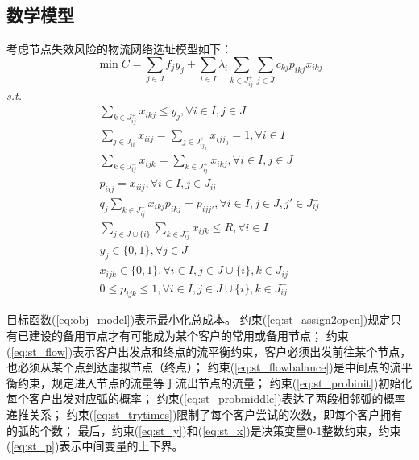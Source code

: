 \subsection{数学模型}
\label{subsec:st}
考虑节点失效风险的物流网络选址模型如下：
\begin{equation}
\label{eq:obj_model}
\min C = \sum_{j\in J}f_jy_j + \sum_{i\in I}\lambda_i \sum_{k\in J_{ij}^+}\sum_{j\in \bar{J}} c_{kj} p_{ikj} x_{ikj}
\end{equation}
\textit{s.t.}
\begin{gather}
\sum_{k\in J_{ij}^+}x_{ikj} \le y_j ,\forall i \in I , j\in J \label{eq:st_assign2open}\\
\sum_{j\in J_{ii}^-}x_{iij} = \sum_{j\in J_{i{j_{0}}}^+} x_{ijj_0} = 1, \forall i \in I  \label{eq:st_flow}\\
\sum_{k\in J_{ij}^-} x_{ijk} = \sum_{k\in J_{ij}^+} x_{ikj}, \forall i \in I, j \in J \label{eq:st_flowbalance}\\
p_{iij} = x_{iij}, \forall i\in I, j\in J_{ii}^- \label{eq:st_probinit}\\
q_j\sum_{k\in J_{ij}^+} x_{ikj} p_{ikj}= p_{ijj'}, \forall i \in I, j \in J, j'\in J_{ij}^- \label{eq:st_probmiddle} \\
\sum_{j\in J\cup\{i\}} \sum_{k\in J_{ij}^-} x_{ijk} \le R, \forall i\in I \label{eq:st_trytimes} \\
y_{j} \in\{0,1\}, \forall j \in {J} \label{eq:st_y}\\
x_{ijk} \in \{0,1\}, \forall i \in I, j \in J\cup \{i\}, k\in J_{ij}^- \label{eq:st_x}\\
0 \le p_{ijk} \le 1, \forall i \in I, j \in J\cup \{i\}, k\in J_{ij}^- \label{eq:st_p}
\end{gather}

目标函数(\ref{eq:obj_model})表示最小化总成本。
约束(\ref{eq:st_assign2open})规定只有已建设的备用节点才有可能成为某个客户的常用或备用节点；
约束(\ref{eq:st_flow})表示客户出发点和终点的流平衡约束，客户必须出发前往某个节点，也必须从某个点到达虚拟节点（终点）；
约束(\ref{eq:st_flowbalance})是中间点的流平衡约束，规定进入节点的流量等于流出节点的流量；
约束(\ref{eq:st_probinit})初始化每个客户出发对应弧的概率；
约束(\ref{eq:st_probmiddle})表达了两段相邻弧的概率递推关系；
约束(\ref{eq:st_trytimes})限制了每个客户尝试的次数，即每个客户拥有的弧的个数；
最后，约束(\ref{eq:st_y})和(\ref{eq:st_x})是决策变量0-1整数约束，约束(\ref{eq:st_p})表示中间变量的上下界。

